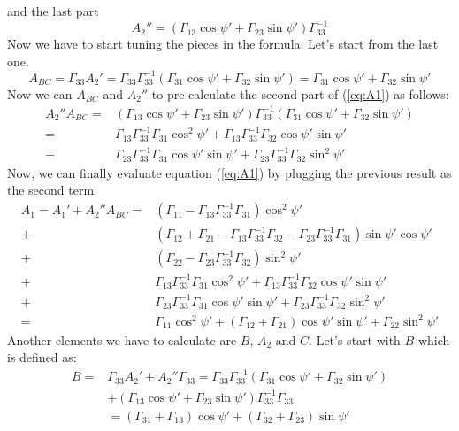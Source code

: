 \documentclass[12pt,a4paper]{article}
\begin{document}
and the last part
\begin{equation}
\label{eq:A2dblprime}
A_2'' = (\Gamma_{13} \cos{\psi'} + \Gamma_{23} \sin{\psi'})\Gamma_{33}^{-1}  
\end{equation}
Now we have to start tuning the pieces in the formula. Let's start from the last one.
\begin{equation}
\label{eq:ABC}
A_{BC} = \Gamma_{33}A_2' = \Gamma_{33}\Gamma_{33}^{-1}(\Gamma_{31} \cos{\psi'} + \Gamma_{32} \sin{\psi'}) = \Gamma_{31} \cos{\psi'} + \Gamma_{32} \sin{\psi'}
\end{equation}
Now we can $A_{BC}$ and $A_2''$ to pre-calculate the second part of (\ref{eq:A1}) as follows:
\begin{align*}
	A_2'' A_{BC} = & (\Gamma_{13} \cos{\psi'} + \Gamma_{23} \sin{\psi'})\Gamma_{33}^{-1} (\Gamma_{31} \cos{\psi'} + \Gamma_{32} \sin{\psi'}) \nonumber\\
				 = & \Gamma_{13}\Gamma_{33}^{-1}\Gamma_{31} \cos^2{\psi'} + \Gamma_{13}\Gamma_{33}^{-1}\Gamma_{32} \cos{\psi'}\sin{\psi'} \nonumber \\
				 + & \Gamma_{23}\Gamma_{33}^{-1}\Gamma_{31}\cos{\psi'}\sin{\psi'}+ \Gamma_{23}\Gamma_{33}^{-1}\Gamma_{32} \sin^2{\psi'}
\end{align*}
Now, we can finally evaluate equation (\ref{eq:A1}) by plugging the previous result as the second term
\begin{align*}
	A_1= A_1'+A_2''A_{BC} = &(\Gamma_{11}-\Gamma_{13}\Gamma_{33}^{-1}\Gamma_{31})\cos^2{\psi'} \nonumber\\
				 + &(\Gamma_{12}+\Gamma_{21}-\Gamma_{13}\Gamma_{33}^{-1}\Gamma_{32} - \Gamma_{23}\Gamma_{33}^{-1}\Gamma_{31})\sin{\psi'}\cos{\psi'} \nonumber\\
				 + & (\Gamma_{22}-\Gamma_{23}\Gamma_{33}^{-1}\Gamma_{32})\sin^2{\psi'}\\
				 + &  \Gamma_{13}\Gamma_{33}^{-1}\Gamma_{31} \cos^2{\psi'} + \Gamma_{13}\Gamma_{33}^{-1}\Gamma_{32} \cos{\psi'}\sin{\psi'} \nonumber \\
				 + & \Gamma_{23}\Gamma_{33}^{-1}\Gamma_{31}\cos{\psi'}\sin{\psi'}+ \Gamma_{23}\Gamma_{33}^{-1}\Gamma_{32} \sin^2{\psi'} \nonumber \\
				 = & \Gamma_{11}\cos^2{\psi'} + (\Gamma_{12}+\Gamma_{21})\cos{\psi'}\sin{\psi'} + \Gamma_{22}\sin^2{\psi'}
\end{align*}
Another elements we have to calculate are $B$, $A_2$ and $C$. Let's start with $B$ which is defined as:
\begin{align}
	B = &\Gamma_{33}A_2' + A_2''\Gamma_{33} = \Gamma_{33} \Gamma_{33}^{-1}(\Gamma_{31} \cos{\psi'} + \Gamma_{32} \sin{\psi'}) \nonumber \\
		&+ (\Gamma_{13} \cos{\psi'} + \Gamma_{23} \sin{\psi'})\Gamma_{33}^{-1}\Gamma_{33} \nonumber \\
		& = (\Gamma_{31} + \Gamma_{13}) \cos{\psi'} + (\Gamma_{32} + \Gamma_{23})\sin{\psi'}
\end{align}
\end{document}
